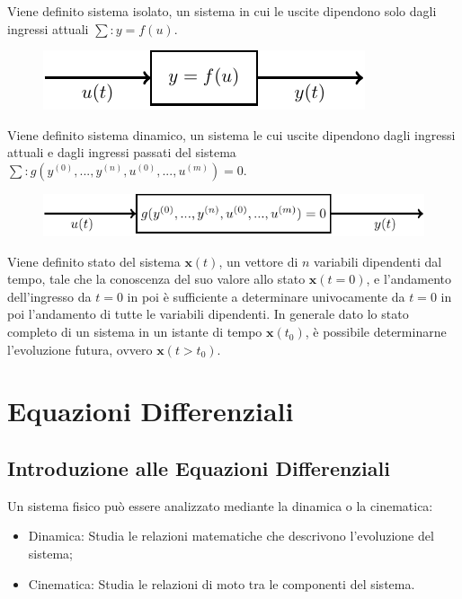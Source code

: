 \documentclass{article}
\numberwithin{equation}{subsection}
\begin{document}
Viene definito sistema isolato, un sistema in cui le uscite dipendono solo dagli ingressi attuali $\sum:y=f(u)$.

\begin{figure}[H]%
    \centering
    \includegraphics{blocco-funzionale-2.pdf}%
\end{figure}

Viene definito sistema dinamico, un sistema le cui uscite dipendono dagli ingressi attuali e dagli ingressi passati del sistema 
$\sum:g(y^{(0)},...,y^{(n)},u^{(0)},...,u^{(m)})=0$.

\begin{figure}[H]%
    \centering
    \includegraphics{sistema-1.pdf}%
\end{figure}

Viene definito stato del sistema $\mathbf{x}(t)$, un vettore di $n$ variabili dipendenti dal tempo, tale che la conoscenza del suo valore 
allo stato $\mathbf{x}(t=0)$, e l'andamento dell'ingresso da $t=0$ in poi è sufficiente a determinare univocamente da $t=0$ in poi l'andamento di tutte le 
variabili dipendenti. 
In generale dato lo stato completo di un sistema in un istante di tempo $\mathbf{x}(t_0)$, è possibile determinarne l'evoluzione futura, ovvero 
$\mathbf{x}(t>t_0)$. 

\clearpage

\section{Equazioni Differenziali}

\subsection{Introduzione alle Equazioni Differenziali}

Un sistema fisico può essere analizzato mediante la dinamica o la cinematica:
\begin{itemize}
    \item Dinamica: Studia le relazioni matematiche che descrivono l'evoluzione del sistema;
    \item Cinematica: Studia le relazioni di moto tra le componenti del sistema.
\end{itemize} 
\end{document}

